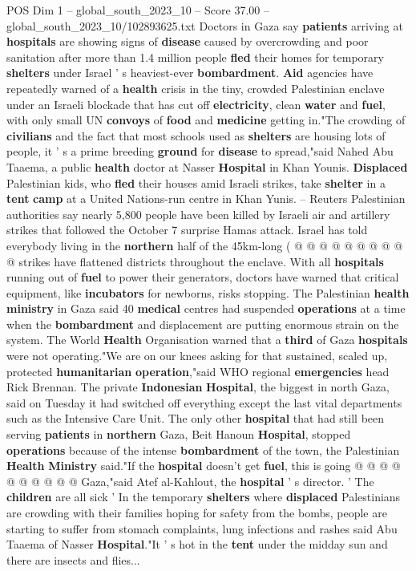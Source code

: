 \begin{textsample}{POS Dim 1 – global\_south\_2023\_10 – Score 37.00 – global\_south\_2023\_10/102893625.txt}  \label{ex:f1_pos_184}
Doctors in Gaza say \textbf{patients} arriving at \textbf{hospitals} are showing signs of \textbf{disease} caused by overcrowding and poor sanitation after more than 1.4 million people \textbf{fled} their homes for temporary \textbf{shelters} under Israel ' s heaviest-ever \textbf{bombardment}. \textbf{Aid} agencies have repeatedly warned of a \textbf{health} crisis in the tiny, crowded Palestinian enclave under an Israeli blockade that has cut off \textbf{electricity}, clean \textbf{water} and \textbf{fuel}, with only small UN \textbf{convoys} of \textbf{food} and \textbf{medicine} getting in."The crowding of \textbf{civilians} and the fact that most schools used as \textbf{shelters} are housing lots of people, it ' s a prime breeding \textbf{ground} for \textbf{disease} to spread,"said Nahed Abu Taaema, a public \textbf{health} doctor at Nasser \textbf{Hospital} in Khan Younis. \textbf{Displaced} Palestinian kids, who \textbf{fled} their houses amid Israeli strikes, take \textbf{shelter} in a \textbf{tent} \textbf{camp} at a United Nations-run centre in Khan Yunis. -- Reuters Palestinian authorities say nearly 5,800 people have been killed by Israeli air and artillery strikes that followed the October 7 surprise Hamas attack.
Israel has told everybody living in the \textbf{northern} half of the 45km-long ( @ @ @ @ @ @ @ @ @ @ strikes have flattened districts throughout the enclave.
With all \textbf{hospitals} running out of \textbf{fuel} to power their generators, doctors have warned that critical equipment, like \textbf{incubators} for newborns, risks stopping.
The Palestinian \textbf{health} \textbf{ministry} in Gaza said 40 \textbf{medical} centres had suspended \textbf{operations} at a time when the \textbf{bombardment} and displacement are putting enormous strain on the system.
The World \textbf{Health} Organisation warned that a \textbf{third} of Gaza \textbf{hospitals} were not operating."We are on our knees asking for that sustained, scaled up, protected \textbf{humanitarian} \textbf{operation},"said WHO regional \textbf{emergencies} head Rick Brennan.
The private \textbf{Indonesian} \textbf{Hospital}, the biggest in north Gaza, said on Tuesday it had switched off everything except the last vital departments such as the Intensive Care Unit.
The only other \textbf{hospital} that had still been serving \textbf{patients} in \textbf{northern} Gaza, Beit Hanoun \textbf{Hospital}, stopped \textbf{operations} because of the intense \textbf{bombardment} of the town, the Palestinian \textbf{Health} \textbf{Ministry} said."If the \textbf{hospital} doesn't get \textbf{fuel}, this is going @ @ @ @ @ @ @ @ @ @ Gaza,"said Atef al-Kahlout, the \textbf{hospital} ' s director. ' The \textbf{children} are all sick ' In the temporary \textbf{shelters} where \textbf{displaced} Palestinians are crowding with their families hoping for safety from the bombs, people are starting to suffer from stomach complaints, lung infections and rashes said Abu Taaema of Nasser \textbf{Hospital}."It ' s hot in the \textbf{tent} under the midday sun and there are insects and flies...

\end{textsample}
